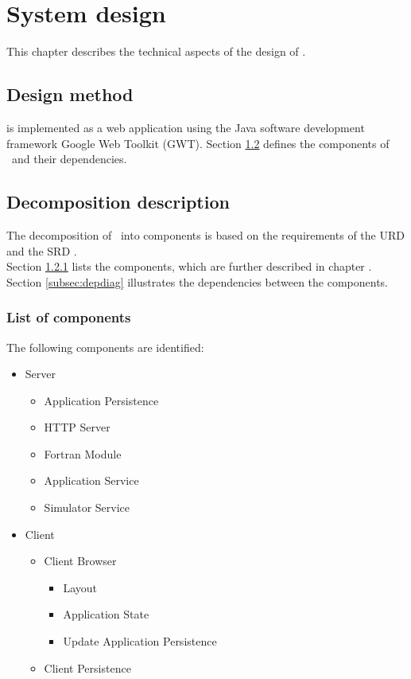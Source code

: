 \chapter{System design}
\label{chap:systdesign}
This chapter describes the technical aspects of the design of \projectname. \\

\section{Design method}
\projectname is implemented as a web application using the Java software development framework Google Web Toolkit (GWT). Section \ref{sec:decompdescr} defines the components of \projectname\ and their dependencies. \\


\section{Decomposition description}
\label{sec:decompdescr}
The decomposition of \projectname\ into components is based on the requirements of the URD \cite{urd} and the SRD \cite{srd}.\\
 Section \ref{subsec:complist} lists the components, which are further described in chapter \label{chap:compdescr}. Section \ref{subsec:depdiag} illustrates the dependencies between the components.

\subsection{List of components}
\label{subsec:complist}
The following components are identiﬁed:\\

\begin{itemize}
\item Server
\begin{itemize}
\item Application Persistence
\item HTTP Server
\item Fortran Module
\item Application Service
\item Simulator Service
\end{itemize}
\item Client
\begin{itemize}
\item Client Browser
\begin{itemize}
\item Layout
\item Application State
\item Update Application Persistence
\end{itemize}
\item Client Persistence
\end{itemize}
\end{itemize}

